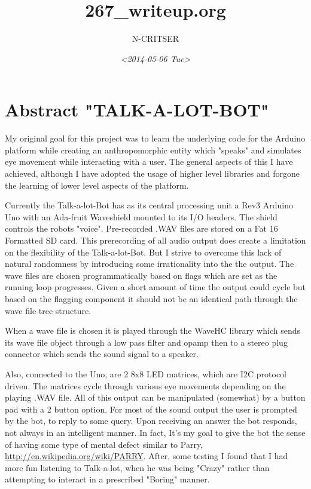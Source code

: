 \documentclass[a4paper,6pt]{article}
\author{N-CRITSER}
\date{\textit{<2014-05-06 Tue>}}
\title{267\_writeup.org}
\begin{document}
\maketitle



\section{Abstract "TALK-A-LOT-BOT"}
\label{sec-1}
    My original goal for this project was to learn the underlying code for 
the Arduino platform while creating an anthropomorphic entity which "speaks"
and simulates eye movement while interacting with a user.  The general aspects
of this I have achieved, although I have adopted the usage of higher level 
libraries and forgone the learning of lower level aspects of the platform.  

    Currently the Talk-a-lot-Bot has as its central processing unit a Rev3 
Arduino Uno with an Ada-fruit Waveshield mounted to its I/O headers. The shield
controls the robots "voice".  Pre-recorded .WAV files are stored on a 
Fat 16 Formatted SD card.  This prerecording of all audio output does 
create a limitation on the flexibility of the Talk-a-lot-Bot.  But I strive 
to overcome this lack of natural randomness by introducing some irrationality
into the the output.  The wave files are chosen programmatically based on 
flags which are set as the running loop progresses.  Given a short amount of 
time the output could cycle but based on the flagging component it should not 
be an identical path through the wave file tree structure.  

    When a wave file is chosen it is played through the WaveHC library which
sends its wave file object through a low pass filter and opamp then to 
a stereo plug connector which sends the sound signal  to a speaker.  

Also, connected to the Uno, are 2 8x8 LED matrices, which are I2C protocol driven. 
The matrices cycle through various eye movements depending on the playing 
.WAV file.  All of this output can be manipulated (somewhat) by a button pad
with a 2 button option.  For most of the sound output the user is prompted by
the bot, to reply to some query.  Upon receiving an answer the bot responds,
not always in an intelligent manner.  In fact, It's my goal to give the bot
the sense of having some type of mental defect similar to Parry,
\url{http://en.wikipedia.org/wiki/PARRY}.   After, some testing I found that I had
more fun listening to Talk-a-lot, when he was being "Crazy" rather than 
attempting to interact in a prescribed "Boring" manner. 
\end{document}
